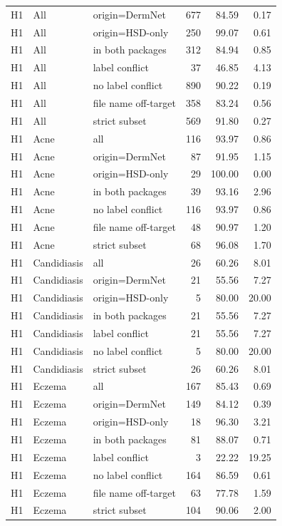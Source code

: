 \begin{tabular}{lllrrr}
H1 & All & origin=DermNet & 677 & 84.59 & 0.17 \\
H1 & All & origin=HSD-only & 250 & 99.07 & 0.61 \\
H1 & All & in both packages & 312 & 84.94 & 0.85 \\
H1 & All & label conflict & 37 & 46.85 & 4.13 \\
H1 & All & no label conflict & 890 & 90.22 & 0.19 \\
H1 & All & file name off-target & 358 & 83.24 & 0.56 \\
H1 & All & strict subset & 569 & 91.80 & 0.27 \\
H1 & Acne & all & 116 & 93.97 & 0.86 \\
H1 & Acne & origin=DermNet & 87 & 91.95 & 1.15 \\
H1 & Acne & origin=HSD-only & 29 & 100.00 & 0.00 \\
H1 & Acne & in both packages & 39 & 93.16 & 2.96 \\
H1 & Acne & no label conflict & 116 & 93.97 & 0.86 \\
H1 & Acne & file name off-target & 48 & 90.97 & 1.20 \\
H1 & Acne & strict subset & 68 & 96.08 & 1.70 \\
H1 & Candidiasis & all & 26 & 60.26 & 8.01 \\
H1 & Candidiasis & origin=DermNet & 21 & 55.56 & 7.27 \\
H1 & Candidiasis & origin=HSD-only & 5 & 80.00 & 20.00 \\
H1 & Candidiasis & in both packages & 21 & 55.56 & 7.27 \\
H1 & Candidiasis & label conflict & 21 & 55.56 & 7.27 \\
H1 & Candidiasis & no label conflict & 5 & 80.00 & 20.00 \\
H1 & Candidiasis & strict subset & 26 & 60.26 & 8.01 \\
H1 & Eczema & all & 167 & 85.43 & 0.69 \\
H1 & Eczema & origin=DermNet & 149 & 84.12 & 0.39 \\
H1 & Eczema & origin=HSD-only & 18 & 96.30 & 3.21 \\
H1 & Eczema & in both packages & 81 & 88.07 & 0.71 \\
H1 & Eczema & label conflict & 3 & 22.22 & 19.25 \\
H1 & Eczema & no label conflict & 164 & 86.59 & 0.61 \\
H1 & Eczema & file name off-target & 63 & 77.78 & 1.59 \\
H1 & Eczema & strict subset & 104 & 90.06 & 2.00 \\

\end{tabular}
